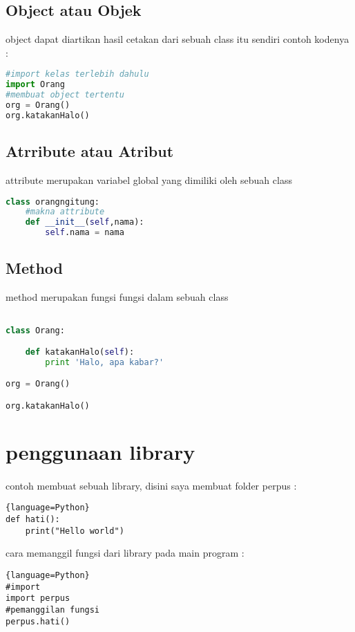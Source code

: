 \documentclass[a4paper,12pt]{report}
\begin{document}
\subsection*{Object atau Objek}
object dapat diartikan hasil cetakan dari sebuah class itu sendiri
contoh kodenya :
\begin{lstlisting}[language=Python]
#import kelas terlebih dahulu
import Orang
#membuat object tertentu
org = Orang()
org.katakanHalo()

\end{lstlisting}
\subsection*{Atrribute atau Atribut}
attribute merupakan variabel global yang dimiliki oleh sebuah class
\begin{lstlisting}[language=Python]
class orangngitung:
	#makna attribute
    def __init__(self,nama):
        self.nama = nama
\end{lstlisting}
\subsection*{Method}
method merupakan fungsi fungsi dalam sebuah class
\begin{lstlisting}[language=Python]

class Orang:

    def katakanHalo(self):
        print 'Halo, apa kabar?'

org = Orang()

org.katakanHalo()
\end{lstlisting}

\section{penggunaan library}
\paragraph{}
contoh membuat sebuah library, disini saya membuat folder perpus :
\begin{lstlisting}{language=Python}
def hati():
    print("Hello world")
\end{lstlisting}

cara memanggil fungsi dari library pada main program :
\begin{lstlisting}{language=Python}
#import
import perpus
#pemanggilan fungsi
perpus.hati()
\end{lstlisting}
\end{document}
